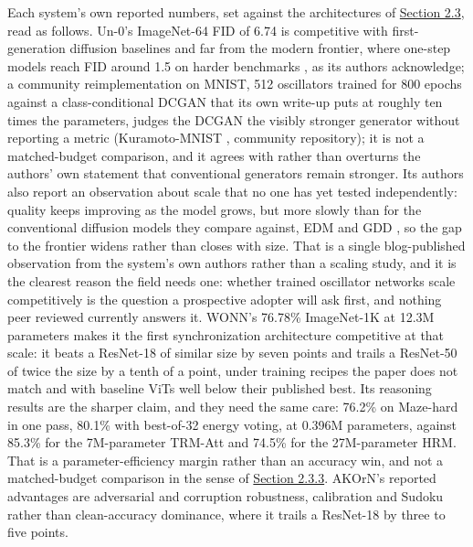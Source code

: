 \documentclass[a4paper,fleqn]{cas-sc}
\begin{document}
Each system's own reported numbers, set against the architectures of
\hyperref[sec-2-3]{Section 2.3}, read as follows. Un-0's ImageNet-64 FID
of 6.74 is competitive with first-generation diffusion baselines and far
from the modern frontier, where one-step models reach FID around 1.5 on
harder benchmarks \citep{deng2026}, as its authors acknowledge; a
community reimplementation on MNIST, 512 oscillators trained for 800
epochs against a class-conditional DCGAN that its own write-up puts at
roughly ten times the parameters, judges the DCGAN the visibly stronger
generator without reporting a metric (Kuramoto-MNIST
\citep{kuramoto-mnist}, community repository); it is not a
matched-budget comparison, and it agrees with rather than overturns the
authors' own statement that conventional generators remain stronger. Its
authors also report an observation about scale that no one has yet
tested independently: quality keeps improving as the model grows, but
more slowly than for the conventional diffusion models they compare
against, EDM \citep{edm} and GDD \citep{gdd}, so the gap to the frontier
widens rather than closes with size. That is a single blog-published
observation from the system's own authors rather than a scaling study,
and it is the clearest reason the field needs one: whether trained
oscillator networks scale competitively is the question a prospective
adopter will ask first, and nothing peer reviewed currently answers it.
WONN's 76.78\% ImageNet-1K at 12.3M parameters makes it the first
synchronization architecture competitive at that scale: it beats a
ResNet-18 of similar size by seven points and trails a ResNet-50 of
twice the size by a tenth of a point, under training recipes the paper
does not match and with baseline ViTs well below their published best.
Its reasoning results are the sharper claim, and they need the same
care: 76.2\% on Maze-hard in one pass, 80.1\% with best-of-32 energy
voting, at 0.396M parameters, against 85.3\% for the 7M-parameter
TRM-Att and 74.5\% for the 27M-parameter HRM. That is a
parameter-efficiency margin rather than an accuracy win, and not a
matched-budget comparison in the sense of \hyperref[sec-2-3-3]{Section
2.3.3}. AKOrN's reported advantages are adversarial and corruption
robustness, calibration and Sudoku rather than clean-accuracy dominance,
where it trails a ResNet-18 by three to five points.
\end{document}
